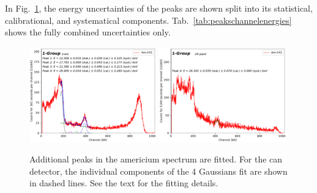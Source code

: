 In Fig.~\ref{fig:peaksearch}, the energy uncertainties of the peaks are shown split into its statistical, calibrational, and systematical components. Tab.~\ref{tab:peakschannelenergies} shows the fully combined uncertainties only.

\begin{figure}[htbp]
  \includegraphics[width=0.49\textwidth,page=1]{graphics/peaksearch.pdf}
  \includegraphics[width=0.49\textwidth,page=1]{graphics/alupeaksearch.pdf}
  \caption{Additional peaks in the americium spectrum are fitted. For the can detector, the individual components of the 4 Gaussians fit are shown in dashed lines. See the text for the fitting details.}
  \label{fig:peaksearch}
\end{figure}

